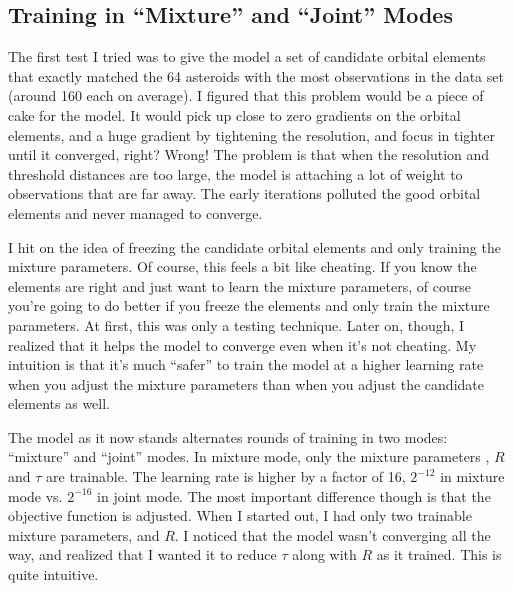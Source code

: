 \subsection{Training in ``Mixture'' and ``Joint'' Modes}
The first test I tried was to give the model a set of candidate orbital elements that exactly 
matched the 64 asteroids with the most observations in the data set (around 160 each on average).
I figured that this problem would be a piece of cake for the model.
It would pick up close to zero gradients on the orbital elements, and a huge gradient by tightening the resolution,
and focus in tighter until it converged, right?
Wrong! The problem is that when the resolution and threshold distances are too large, 
the model is attaching a lot of weight to observations that are far away.
The early iterations polluted the good orbital elements and never managed to converge.

I hit on the idea of freezing the candidate orbital elements and only training the mixture parameters.
Of course, this feels a bit like cheating.  
If you know the elements are right and just want to learn the mixture parameters, 
of course you're going to do better if you freeze the elements and only train the mixture parameters.
At first, this was only a testing technique.
Later on, though, I realized that it helps the model to converge even when it's not cheating.
My intuition is that it's much ``safer'' to train the model at a higher learning rate when you adjust 
the mixture parameters than when you adjust the candidate elements as well.

The model as it now stands alternates rounds of training in two modes: ``mixture'' and ``joint'' modes.
In mixture mode, only the mixture parameters , $R$ and $\tau$ are trainable.
The learning rate is higher by a factor of 16, $2^{-12}$ in mixture mode vs. $2^{-16}$ in joint mode.
The most important difference though is that the objective function is adjusted.
When I started out, I had only two trainable mixture parameters,  and $R$.
I noticed that the model wasn't converging all the way, and realized that I wanted it to reduce $\tau$ along with $R$ as it trained.
This is quite intuitive.  


